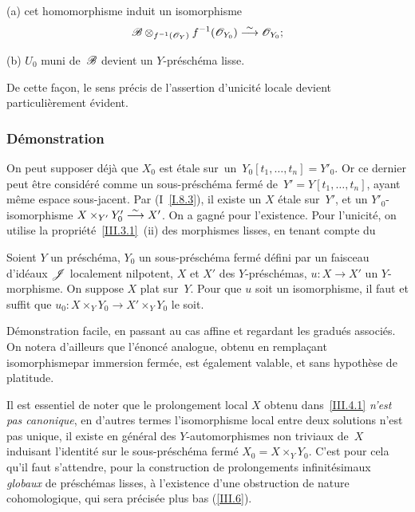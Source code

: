 (a) cet homomorphisme induit un isomorphisme
$$
\cal{B}\otimes_{f^{-1}(\cal{O}_Y)} f^{-1}(\cal{O}_{Y_0})\isomto
\cal{O}_{Y_0};
$$

(b) $U_0$ muni de~$\cal{B}$ devient un $Y$-pr\'esch\'ema lisse.

De cette fa\c con, le sens pr\'ecis de l'assertion d'unicit\'e
locale devient particuli\`erement \'evident.

\subsubsection*{D\'emonstration} On peut supposer d\'ej\`a que $X_0$ est
\'etale \hbox{sur un $Y_0[t_1,\dots,t_n]=Y'_0$}. Or ce dernier peut
\^etre consid\'er\'e comme un sous-pr\'esch\'ema ferm\'e
de~$Y'{=} Y[t_1,\dots,t_n]$, ayant m\^eme espace sous-jacent. Par
(I~\ref{I.8.3}), il existe un $X$ \'etale sur~$Y'$, et un
$Y'_0$-isomorphisme $X\times_{Y'}Y'_0\overset{\sim}{\longrightarrow} X'$. On a gagn\'e pour
l'existence. Pour l'unicit\'e, on utilise la
propri\'et\'e~\ref{III.3.1}~(ii)
des morphismes lisses, en tenant compte du

\begin{lemme}
\label{III.4.2}
Soient $Y$ un pr\'esch\'ema, $Y_0$ un sous-pr\'esch\'ema
ferm\'e d\'efini par un faisceau d'id\'eaux $\cal{J}$ localement
nilpotent, $X$ et $X'$ des $Y$-pr\'esch\'emas, $u\colon X\to X'$
un $Y$-morphisme. On suppose $X$ plat sur~$Y$. Pour que $u$ soit un
isomorphisme, il faut et suffit que $u_0\colon X\times_Y Y_0\to
X'\times_Y Y_0$ le soit.
\end{lemme}

D\'emonstration facile, en passant au cas affine et regardant les
gradu\'es associ\'es. On notera d'ailleurs que l'\'enonc\'e
analogue, obtenu en rempla\c cant \og isomorphisme\fg par \og immersion
ferm\'ee\fg, est \'egalement valable, et sans hypoth\`ese de
platitude.

\begin{remarque}
\label{III.4.3}
Il est essentiel de noter que le prolongement local $X$ obtenu
dans~\ref{III.4.1} {\emph{n'est pas canonique}}, en d'autres termes
l'isomorphisme local entre deux solutions n'est pas unique, \ie il
existe en g\'en\'eral des $Y$-automorphismes non triviaux de~$X$
induisant l'identit\'e sur le sous-pr\'esch\'ema ferm\'e
$X_0=X\times_Y Y_0$. C'est pour cela qu'il faut s'attendre, pour la
construction de prolongements infinit\'esimaux {\emph{globaux}} de
pr\'esch\'emas
lisses, \`a l'existence d'une obstruction de
nature cohomologique, qui sera pr\'ecis\'ee plus bas (\no \ref{III.6}).
\end{remarque}

